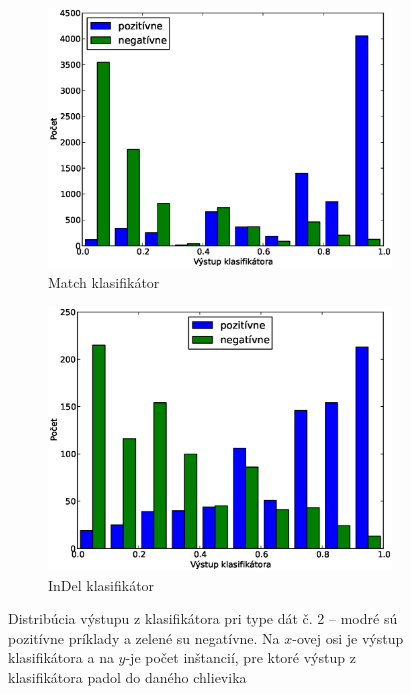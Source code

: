 \begin{figure}[htp]
        \centering
        \begin{subfigure}[t]{0.4\textwidth}
                \includegraphics[width=\textwidth]{images/clf_fi/randomforest_cmp_5_test}
                \caption{Match klasifikátor}
                \label{fig:datatype2-out-m}
        \end{subfigure}%
        \qquad\qquad %
        \begin{subfigure}[t]{0.4\textwidth}
                \includegraphics[width=\textwidth]{images/clf_fi/randomforest_cmp_5_indel_test}
                \caption{InDel klasifikátor}
                \label{fig:datatype2-out-i}
        \end{subfigure}
        \caption[Distribúcia výstupu z klasifikátora pri type dát č. 2]{Distribúcia výstupu z klasifikátora pri type dát č. 2 -- modré sú pozitívne príklady a zelené su negatívne. Na $x$-ovej osi je výstup klasifikátora a na $y$-je počet inštancií, pre ktoré výstup z klasifikátora padol do daného chlievika}
        \label{fig:datatype2-out}
\end{figure}

